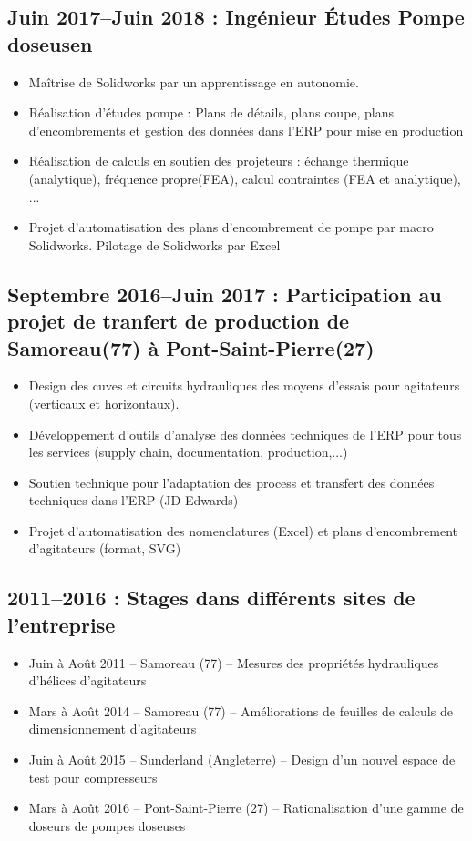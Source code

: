 \documentclass[10pt,a4paper,sans]{article}
\begin{document}
\begin{minipage}[t]{0.70\textwidth}
    \subsection{Juin 2017--Juin 2018 : Ingénieur Études Pompe doseusen}
    \begin{itemize}
        \item Maîtrise de Solidworks par un apprentissage en autonomie.
        \item Réalisation d’études pompe : Plans de détails, plans coupe, plans d’encombrements et gestion des données dans l’ERP pour mise en production
        \item Réalisation de calculs en soutien des projeteurs : échange thermique (analytique), fréquence propre(FEA), calcul contraintes (FEA et analytique), ...
        \item Projet d’automatisation des plans d’encombrement de pompe par macro Solidworks. Pilotage de Solidworks par Excel
    \end{itemize}

    \subsection{Septembre 2016--Juin 2017 : Participation au projet de tranfert de production de Samoreau(77) à Pont-Saint-Pierre(27)}
    \begin{itemize}
        \item Design des cuves et circuits hydrauliques des moyens d’essais pour agitateurs (verticaux et horizontaux).
        \item Développement d’outils d’analyse des données techniques de l’ERP pour tous les services (supply chain, documentation, production,...)
        \item Soutien technique pour l’adaptation des process et transfert des données techniques dans l’ERP (JD Edwards)
        \item Projet d’automatisation des nomenclatures (Excel) et plans d’encombrement d’agitateurs (format, SVG)
    \end{itemize}


    \subsection{2011--2016 : Stages dans différents sites de l'entreprise}
    \begin{itemize}
        \item Juin à Août 2011 – Samoreau (77) – Mesures des propriétés hydrauliques d’hélices d’agitateurs
        \item Mars à Août 2014 – Samoreau (77) – Améliorations de feuilles de calculs de dimensionnement d’agitateurs
        \item Juin à Août 2015 – Sunderland (Angleterre) – Design d’un nouvel espace de test pour compresseurs
        \item Mars à Août 2016 – Pont-Saint-Pierre (27) – Rationalisation d’une gamme de doseurs de pompes doseuses
    \end{itemize}
\end{minipage}
\end{document}
